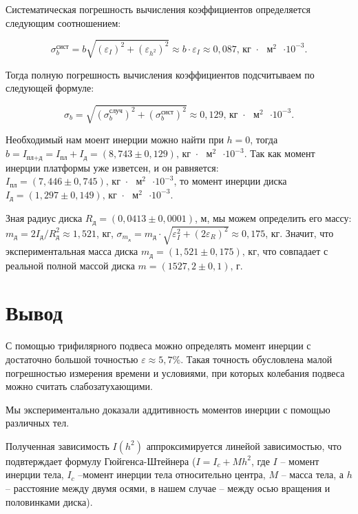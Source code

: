 \documentclass[a4paper,12pt]{article}
\begin{document}
	Систематическая погрешность вычисления коэффициентов определяется следующим соотношением:
	
	\begin{equation}
		\sigma^\text{сист}_b = b\sqrt{\left( \varepsilon_{I} \right)^2 + \left( \varepsilon_{h^2} \right)^2 } \approx b \cdot \varepsilon_I \approx 0,087 \text{,  кг $\cdot$ $\text{м}^2$ $\cdot 10^{-3}$}.
	\end{equation}
	
	Тогда полную погрешность вычисления коэффициентов подсчитываем по следующей формуле:
	
	\begin{equation}
		\sigma_b = \sqrt{\left( \sigma_b^\text{случ} \right)^2 + \left( \sigma_b^\text{сист} \right)^2 } \approx 0,129 \text{,  кг $\cdot$ $\text{м}^2$ $\cdot 10^{-3}$}.
	\end{equation}
	
	Необходимый нам моент инерции можно найти при $h = 0$, тогда $b = I_\text{пл+д} = I_\text{пл} + I_\text{д} = \left(8,743 \pm 0,129\right) \text{,  кг $\cdot$ $\text{м}^2$ $\cdot 10^{-3}$}$. Так как момент инерции платформы уже изветсен, и он равняется: $I_\text{пл} = \left(7,446 \pm 0,745\right) \text{,  кг $\cdot$ $\text{м}^2$ $\cdot 10^{-3}$}$, то момент инерции диска \underline{$I_\text{д} = \left(1,297 \pm 0,149\right) \text{,  кг $\cdot$ $\text{м}^2$ $\cdot 10^{-3}$}$}.
	
	Зная радиус диска $R_\text{д} = (0,0413 \pm 0,0001)$, м, мы можем определить его массу: $m_\text{д} = 2I_\text{д}/R_\text{д}^2 \approx 1,521$, кг, $\sigma_{m_\text{д}} = m_\text{д} \cdot \sqrt{\varepsilon_I^2+\left(2\varepsilon_R\right)^2} \approx  0,175$, кг. Значит, что экспериментальная масса диска \underline{$m_\text{д} = \left(1,521 \pm 0,175 \right)\text{, кг}$}, что совпадает с реальной полной массой диска $m = (1527,2 \pm 0,1)\text{, г}$. 
	
	\section{Вывод}
	
	С помощью трифилярного подвеса можно определять момент инерции с достаточно большой точностью $\varepsilon \approx 5,7\%$. Такая точность обусловлена малой погрешностью измерения времени и условиями, при которых колебания подвеса можно считать слабозатухающими.
	
	Мы экспериментально доказали аддитивность моментов инерции с помощью различных тел.
	
	Полученная зависимость $I(h^2)$ аппроксимируется линейой зависимостью, что подвтерждает формулу Гюйгенса-Штейнера ($I = I_c + Mh^2$, где $I$ -- момент инерции тела, $I_c$ --момент инерции тела относительно центра, $M$ -- масса тела, а $h$ -- расстояние между двумя осями, в нашем случае -- между осью вращения и половинками диска).
	
	
\end{document}
